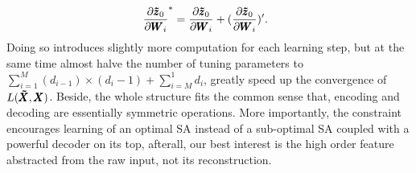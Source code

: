 \begin{equation*}
  \begin{split}\
    \frac{\partial \pmb{\tilde{z}}_0}{\partial \pmb{W}_i}^* &= \frac{\partial \pmb{\tilde{z}}_0}{\partial \pmb{W}_i} + (\frac{\partial \pmb{\tilde{z}}_0}{\partial \pmb{W}_i})^\prime.
  \end{split}
\end{equation*}
Doing so introduces slightly more computation for each learning step, but at the same time almost halve the number of tuning parameters to $\sum_{i=1}^{M}{(d_{i-1}) \times (d_i - 1)} + \sum_{i=M}^{1}{d_i}$, greatly speed up the convergence of $L(\pmb{\tilde{X}}, \pmb{X})$.  Beside, the whole structure fits the common sense that, encoding and decoding are essentially symmetric operations. More importantly, the constraint encourages learning of an optimal SA instead of a sub-optimal SA coupled with a powerful decoder on its top, afterall, our best interest is the high order feature abstracted from the raw input, not its reconstruction.